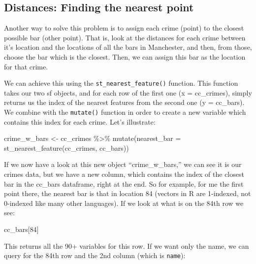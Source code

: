 \documentclass[
]{book}
\newenvironment{Shaded}{\begin{snugshade}}{\end{snugshade}}
\newcommand{\AttributeTok}[1]{\textcolor[rgb]{0.77,0.63,0.00}{#1}}
\newcommand{\DecValTok}[1]{\textcolor[rgb]{0.00,0.00,0.81}{#1}}
\newcommand{\FunctionTok}[1]{\textcolor[rgb]{0.00,0.00,0.00}{#1}}
\newcommand{\NormalTok}[1]{#1}
\newcommand{\OtherTok}[1]{\textcolor[rgb]{0.56,0.35,0.01}{#1}}
\newcommand{\SpecialCharTok}[1]{\textcolor[rgb]{0.00,0.00,0.00}{#1}}
\begin{document}
\hypertarget{distances-finding-the-nearest-point}{%
\subsection{Distances: Finding the nearest point}\label{distances-finding-the-nearest-point}}

Another way to solve this problem is to assign each crime (point) to the closest possible bar (other point). That is, look at the distances for each crime between it's location and the locations of all the bars in Manchester, and then, from those, choose the bar which is the closest. Then, we can assign this bar as the location for that crime.

We can achieve this using the \texttt{st\_nearest\_feature()} function. This function takes our two sf objects, and for each row of the first one (x = cc\_crimes), simply returns us the index of the nearest features from the second one (y = cc\_bars). We combine with the \texttt{mutate()} function in order to create a new variable which contains this index for each crime. Let's illustrate:

\begin{Shaded}
\begin{Highlighting}[]
\NormalTok{crime\_w\_bars }\OtherTok{\textless{}{-}}\NormalTok{ cc\_crimes }\SpecialCharTok{\%\textgreater{}\%} \FunctionTok{mutate}\NormalTok{(}\AttributeTok{nearest\_bar =} \FunctionTok{st\_nearest\_feature}\NormalTok{(cc\_crimes, cc\_bars))}
\end{Highlighting}
\end{Shaded}

If we now have a look at this new object ``crime\_w\_bars,'' we can see it is our crimes data, but we have a new column, which contains the index of the closest bar in the cc\_bars dataframe, right at the end. So for example, for me the first point there, the nearest bar is that in location 84 (vectors in R are 1-indexed, not 0-indexed like many other languages). If we look at what is on the 84th row we see:

\begin{Shaded}
\begin{Highlighting}[]
\NormalTok{cc\_bars[}\DecValTok{84}\NormalTok{]}
\end{Highlighting}
\end{Shaded}

This returns all the 90+ variables for this row. If we want only the name, we can query for the 84th row and the 2nd column (which is \texttt{name}):
\end{document}
